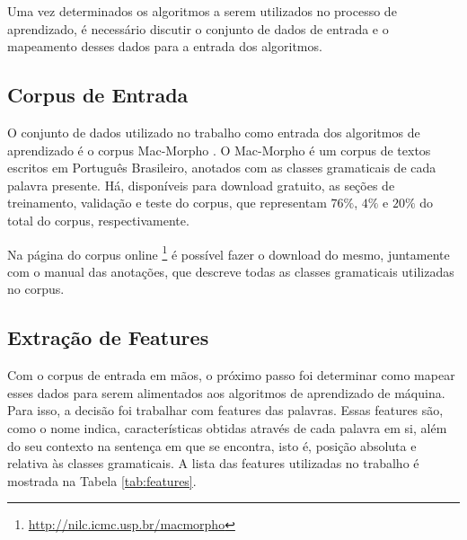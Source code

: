 \documentclass[12pt]{article}
\begin{document}
Uma vez determinados os algoritmos a serem utilizados no processo de aprendizado,
é necessário discutir o conjunto de dados de entrada e o mapeamento desses dados
para a entrada dos algoritmos.

\subsection{Corpus de Entrada}

O conjunto de dados utilizado no trabalho como entrada dos algoritmos de
aprendizado é o corpus Mac-Morpho \cite{Aluisio2003}. O Mac-Morpho é um corpus
de textos escritos em Português Brasileiro, anotados com as classes gramaticais
de cada palavra presente. Há, disponíveis para download gratuito, as seções
de treinamento, validação e teste do corpus, que representam $ 76\% $, $ 4\% $ e
$ 20\% $ do total do corpus, respectivamente.

Na página do corpus online
\footnote{ \url{http://nilc.icmc.usp.br/macmorpho} } é possível fazer o download
 do mesmo, juntamente com o manual das anotações, que descreve todas as classes gramaticais utilizadas no corpus.

\subsection{Extração de Features}

Com o corpus de entrada em mãos, o próximo passo foi determinar como mapear esses
dados para serem alimentados aos algoritmos de aprendizado de máquina. Para isso,
a decisão foi trabalhar com features das palavras. Essas features são, como o
nome indica, características obtidas através de cada palavra em si, além do seu
contexto na sentença em que se encontra, isto é, posição absoluta e relativa às
classes gramaticais. A lista das features utilizadas no trabalho é mostrada
na Tabela \ref{tab:features}.
\end{document}
